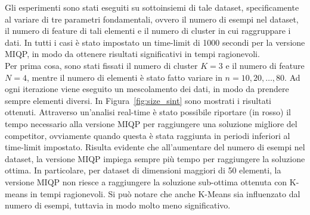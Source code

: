 \documentclass{article}
\begin{document}
    Gli esperimenti sono stati eseguiti su sottoinsiemi di tale dataset, specificamente al variare di tre parametri fondamentali, ovvero il numero di esempi nel dataset, il numero di feature di tali elementi e il numero di cluster in cui raggruppare i dati. In tutti i casi è stato impostato un time-limit di 1000 secondi per la versione MIQP, in modo da ottenere risultati significativi in tempi ragionevoli.\\
    Per prima cosa, sono stati fissati il numero di cluster $K=3$ e il numero di feature $N=4$, mentre il numero di elementi è stato fatto variare in $n=10,20,\dots,80$. Ad ogni iterazione viene eseguito un mescolamento dei dati, in modo da prendere sempre elementi diversi. In Figura~\ref{fig:size_sint} sono mostrati i risultati ottenuti. Attraverso un'analisi real-time è stato possibile riportare (in rosso) il tempo necessario alla versione MIQP per raggiungere una soluzione migliore del competitor, ovviamente quando questa è stata raggiunta in periodi inferiori al time-limit impostato.
    Risulta evidente che all'aumentare del numero di esempi nel dataset, la versione MIQP impiega sempre più tempo per raggiungere la soluzione ottima. In particolare, per dataset di dimensioni maggiori di 50 elementi, la versione MIQP non riesce a raggiungere la soluzione sub-ottima ottenuta con K-means in tempi ragionevoli. Si può notare che anche K-Means sia influenzato dal numero di esempi, tuttavia in modo molto meno significativo.\\
\end{document}
